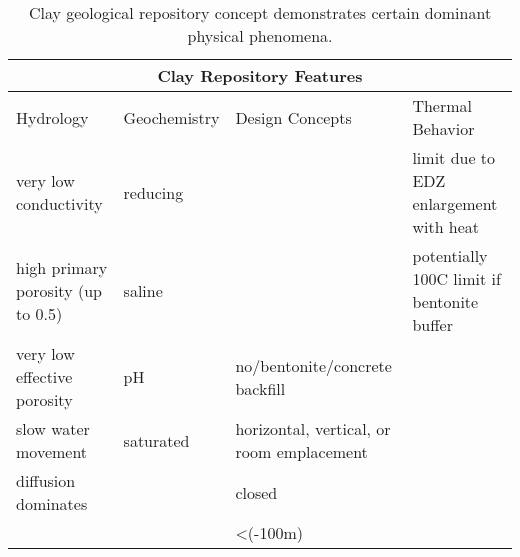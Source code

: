%
\begin{table}
  \centering
  \footnotesize{
  \begin{tabular}{|l|l|l|l|}
    \multicolumn{4}{c}{\textbf{Clay Repository Features}}\\
    \hline
     Hydrology & Geochemistry & Design Concepts & Thermal Behavior \\ 
    \hline
    very low conductivity&reducing&&limit due to EDZ enlargement with heat\\
    high primary porosity (up to 0.5)&saline&&potentially 100C limit if bentonite buffer\\
    very low effective porosity&pH&no/bentonite/concrete backfill&\\
    slow water movement&saturated&horizontal, vertical, or room emplacement&\\
    diffusion dominates&&closed&\\
    &&<(-100m)&\\
    \hline
  \end{tabular}
  \caption[Clay Repository Features]{Clay geological repository 
  concept demonstrates certain dominant physical phenomena. }
  \label{tab:clay_tab}
  }
\end{table}



